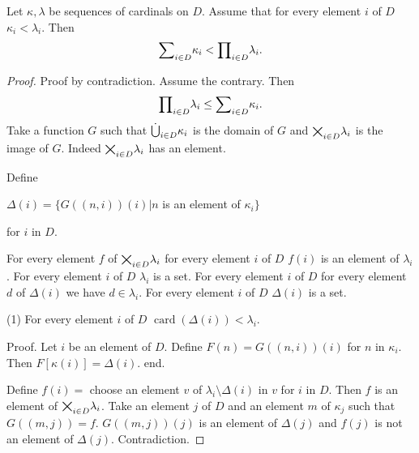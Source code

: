 \documentclass{article}
\newcommand{\val}[2]{#1_{#2}}
\newcommand{\card}[1]{\operatorname{card}(#1)}
\begin{document}
\begin{forthel}
    \begin{theorem}
      Let $\kappa, \lambda$ be sequences of cardinals on $D$.
     Assume that for every element $i$ of $D$
     $\val{\kappa}{i} < \val{\lambda}{i}$.
     Then $$\Sum{\kappa}{D} < \Prod{\lambda}{D}.$$
    \end{theorem}
    \begin{proof}
      Proof by contradiction. Assume the contrary.
      Then $$\Prod{\lambda}{D} \leq \Sum{\kappa}{D}.$$
      Take a function $G$ such that $\SumSet{\kappa}{D}$ is the domain of $G$
      and $\ProdSet{\lambda}{D}$ is the image of $G$.
      Indeed $\ProdSet{\lambda}{D}$ has an element.

      Define

      $\Delta(i) =
     \{G((n,i))(i) | n$ is an element of $\val{\kappa}{i}\}$

      for $i$ in $D$.

      For every element $f$ of $\ProdSet{\lambda}{D}$
      for every element $i$ of $D$
      $f(i)$ is an element of $\val{\lambda}{i}$.
      For every element $i$ of $D$ $\val{\lambda}{i}$ is a set.
      For every element $i$ of $D$ for every element $d$ of $\Delta(i)$
      we have $d\in \val{\lambda}{i}$.
      For every element $i$ of $D$ $\Delta(i)$ is a set.

     (1) For every element $i$ of $D$
      $\card{\Delta(i)} < \val{\lambda}{i}$.

      Proof.
        Let $i$ be an element of $D$.
        Define $F(n) = G((n,i))(i)$ for $n$ in $\val{\kappa}{i}$.
        Then $F[\kappa(i)] = \Delta(i)$.
      end.

      Define
      $f(i) =$ choose an element $v$ of
      $\val{\lambda}{i} \setminus \Delta(i)$ in
      $v$ for $i$ in $D$. Then $f$ is an element of
      $\ProdSet{\lambda}{D}$. Take an element $j$ of $D$ and an
      element $m$ of $\val{\kappa}{j}$ such that $G((m,j)) = f$.
      $G((m,j))(j)$ is an element of $\Delta(j)$ and $f(j)$
      is not an element of $\Delta(j)$. Contradiction.
    \end{proof}
  \end{forthel}
\end{document}
